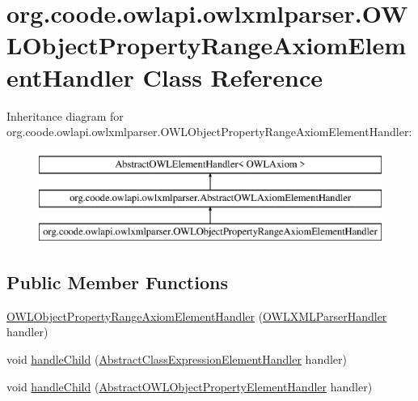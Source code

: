 \hypertarget{classorg_1_1coode_1_1owlapi_1_1owlxmlparser_1_1_o_w_l_object_property_range_axiom_element_handler}{\section{org.\-coode.\-owlapi.\-owlxmlparser.\-O\-W\-L\-Object\-Property\-Range\-Axiom\-Element\-Handler Class Reference}
\label{classorg_1_1coode_1_1owlapi_1_1owlxmlparser_1_1_o_w_l_object_property_range_axiom_element_handler}
}
Inheritance diagram for org.\-coode.\-owlapi.\-owlxmlparser.\-O\-W\-L\-Object\-Property\-Range\-Axiom\-Element\-Handler\-:\begin{figure}[H]
\begin{center}
\leavevmode
\includegraphics[height=3.000000cm]{classorg_1_1coode_1_1owlapi_1_1owlxmlparser_1_1_o_w_l_object_property_range_axiom_element_handler}
\end{center}
\end{figure}
\subsection*{Public Member Functions}
\begin{DoxyCompactItemize}
\item 
\hyperlink{classorg_1_1coode_1_1owlapi_1_1owlxmlparser_1_1_o_w_l_object_property_range_axiom_element_handler_a775bb4449a6589cc579262204eac1e15}{O\-W\-L\-Object\-Property\-Range\-Axiom\-Element\-Handler} (\hyperlink{classorg_1_1coode_1_1owlapi_1_1owlxmlparser_1_1_o_w_l_x_m_l_parser_handler}{O\-W\-L\-X\-M\-L\-Parser\-Handler} handler)
\item 
void \hyperlink{classorg_1_1coode_1_1owlapi_1_1owlxmlparser_1_1_o_w_l_object_property_range_axiom_element_handler_a8b88351d19e4aa2c4b99d33f8cea55d6}{handle\-Child} (\hyperlink{classorg_1_1coode_1_1owlapi_1_1owlxmlparser_1_1_abstract_class_expression_element_handler}{Abstract\-Class\-Expression\-Element\-Handler} handler)
\item 
void \hyperlink{classorg_1_1coode_1_1owlapi_1_1owlxmlparser_1_1_o_w_l_object_property_range_axiom_element_handler_ad746086b3f0ed2ffdbf31514835c8cad}{handle\-Child} (\hyperlink{classorg_1_1coode_1_1owlapi_1_1owlxmlparser_1_1_abstract_o_w_l_object_property_element_handler}{Abstract\-O\-W\-L\-Object\-Property\-Element\-Handler} handler)
\end{DoxyCompactItemize}
